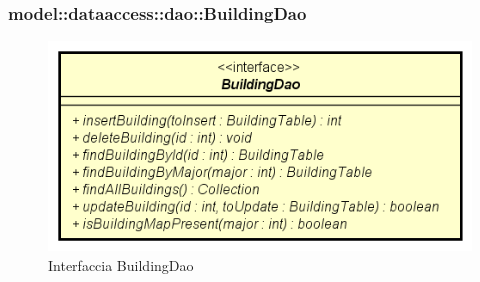 \documentclass[../DefinizioneDiProdotto.tex]{subfiles}
\begin{document}
\subsubsection{model::dataaccess::dao::BuildingDao}

    \begin{figure}[H]
        \centering
        \includegraphics{img/BuildingDao.png}
        \caption{Interfaccia BuildingDao}\label{fig:model::dataaccess::dao::BuildingDao} 
    \end{figure}
\end{document}
